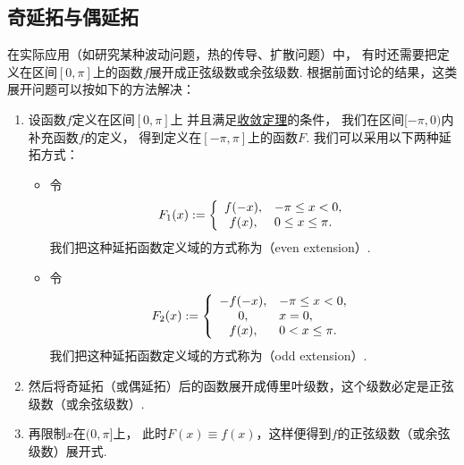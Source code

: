\subsection{奇延拓与偶延拓}
在实际应用（如研究某种波动问题，热的传导、扩散问题）中，
有时还需要把定义在区间\([0,\pi]\)上的函数\(f\)展开成正弦级数或余弦级数.
根据前面讨论的结果，这类展开问题可以按如下的方法解决：
\begin{enumerate}
	\item 设函数\(f\)定义在区间\([0,\pi]\)上
	并且满足\hyperref[theorem:无穷级数.傅里叶级数收敛的狄利克雷充分条件]{收敛定理}的条件，
	我们在区间\([-\pi,0)\)内补充函数\(f\)的定义，
	得到定义在\([-\pi,\pi]\)上的函数\(F\).
	我们可以采用以下两种延拓方式：
	\begin{itemize}
		\item 令\begin{equation*}
			F_1(x)
			:=
			\left\{ \begin{array}{cl}
				f(-x), & -\pi \leq x < 0, \\
				f(x), & 0 \leq x \leq \pi.
			\end{array} \right.
		\end{equation*}
		我们把这种延拓函数定义域的方式称为（even extension）.

		\item 令\begin{equation*}
			F_2(x)
			:=
			\left\{ \begin{array}{cl}
				-f(-x), & -\pi \leq x < 0, \\
				0, & x = 0, \\
				f(x), & 0 < x \leq \pi.
			\end{array} \right.
		\end{equation*}
		我们把这种延拓函数定义域的方式称为（odd extension）.
	\end{itemize}

	\item 然后将奇延拓（或偶延拓）后的函数展开成傅里叶级数，这个级数必定是正弦级数（或余弦级数）.

	\item 再限制\(x\)在\((0,\pi]\)上，
	此时\(F(x)\equiv f(x)\)，这样便得到\(f\)的正弦级数（或余弦级数）展开式.
\end{enumerate}

